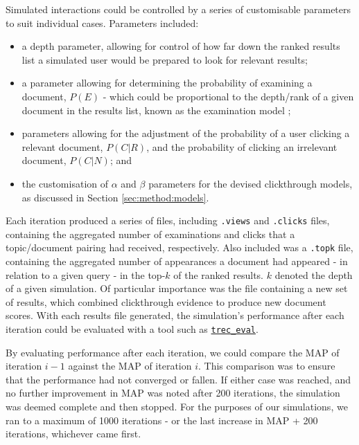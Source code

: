 Simulated interactions could be controlled by a series of customisable parameters to suit individual cases. Parameters included:

\begin{itemize}
	
	\item{a depth parameter, allowing for control of how far down the ranked results list a simulated user would be prepared to look for relevant results;}
	
	\item{a parameter allowing for determining the probability of examining a document, $P(E)$ - which could be proportional to the depth/rank of a given document in the results list, known as the examination model \cite{richardson2007predicting_clicks, craswell2008click_position_bias_models};}
	
	\item{parameters allowing for the adjustment of the probability of a user clicking a relevant document, $P(C|R)$, and the probability of clicking an irrelevant document, $P(C|N)$; and}
	
	\item{the customisation of $\alpha$ and $\beta$ parameters for the devised clickthrough models, as discussed in Section \ref{sec:method:models}.}
	
\end{itemize}

Each iteration produced a series of files, including \texttt{.views} and \texttt{.clicks} files, containing the aggregated number of examinations and clicks that a topic/document pairing had received, respectively. Also included was a \texttt{.topk} file, containing the aggregated number of appearances a document had appeared - in relation to a given query - in the top-$k$ of the ranked results. $k$ denoted the depth of a given simulation. Of particular importance was the file containing a new set of results, which combined clickthrough evidence to produce new document scores. With each results file generated, the simulation's performance after each iteration could be evaluated with a tool such as \href{http://trec.nist.gov/trec_eval/}{\texttt{trec\_eval}}.

By evaluating performance after each iteration, we could compare the MAP of iteration $i-1$ against the MAP of iteration $i$. This comparison was to ensure that the performance had not converged or fallen. If either case was reached, and no further improvement in MAP was noted after 200 iterations, the simulation was deemed complete and then stopped. For the purposes of our simulations, we ran to a maximum of 1000 iterations - or the last increase in MAP + 200 iterations, whichever came first.

